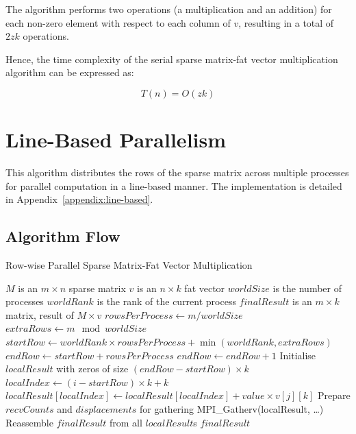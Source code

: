 \documentclass[12pt,oneside]{book} %
\begin{document}
The algorithm performs two operations (a multiplication and an addition) for
each non-zero element with respect to each column of \(v\), resulting in a
total of \(2zk\) operations.

Hence, the time complexity of the serial sparse matrix-fat vector
multiplication algorithm can be expressed as:

\begin{equation}
    T(n) = O(zk)
\end{equation}

\newpage
\section{Line-Based Parallelism}
This algorithm distributes the rows of the sparse matrix across multiple
processes for parallel computation in a line-based manner. The implementation
is detailed in Appendix~\ref{appendix:line-based}.

\subsection{Algorithm Flow}

\begin{algorithm}[H]
    \caption{Row-wise Parallel Sparse Matrix-Fat Vector Multiplication}
    \begin{algorithmic}
        \Require $M$ is an $m \times n$ sparse matrix
        \Require $v$ is an $n \times k$ fat vector
        \Require $worldSize$ is the number of processes
        \Require $worldRank$ is the rank of the current process
        \Ensure  $finalResult$ is an $m \times k$ matrix, result of $M \times v$
        \State $rowsPerProcess \gets m / worldSize$
        \State $extraRows \gets m \mod worldSize$
        \State $startRow \gets worldRank \times rowsPerProcess + \min(worldRank, extraRows)$
        \State $endRow \gets startRow + rowsPerProcess$
        \State $endRow \gets endRow + 1$
        \EndIf
        \State Initialise $localResult$ with zeros of size $(endRow - startRow) \times k$
        \State $localIndex \gets (i - startRow) \times k + k$
        \State $localResult[localIndex] \gets localResult[localIndex] + value \times v[j][k]$
        \EndFor
        \EndFor
        \EndFor
        \State Prepare $recvCounts$ and $displacements$ for gathering
        \EndIf
        \State MPI\_Gatherv(localResult, \ldots)
        \State Reassemble $finalResult$ from all $localResult$s
        \State \Return $finalResult$
        \EndIf
    \end{algorithmic}
\end{algorithm}
\end{document}
